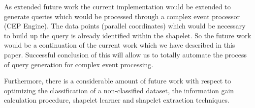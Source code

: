 \documentclass[letterpaper, 10 pt, conference]{IEEEtran}  %
\begin{document}
As extended future work the current implementation would be extended to generate queries which would be processed through a complex event processor (CEP Engine). The data points (parallel coordinates) which would be necessary to build up the query is already identified within the shapelet. So the future work would be a continuation of the current work which we have described in this paper. Successful conclusion of this will allow us to totally automate the process of query generation for complex event processing. 

Furthermore, there is a considerable amount of future work with respect to optimizing the classification of a non-classified dataset, the information gain calculation procedure, shapelet learner and shapelet extraction techniques. 
 

\begin{thebibliography}{99}


\end{thebibliography}
\end{document}
